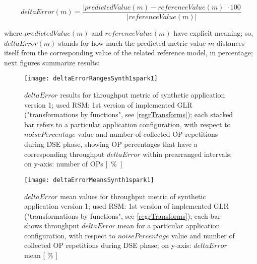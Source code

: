 \[
deltaError(m) = \dfrac{\left\vert predictedValue(m) - referenceValue(m) \right\vert \cdot 100}{\left\vert referenceValue(m) \right\vert}
\]

where $predictedValue(m)$ and $referenceValue(m)$ have explicit meaning; so, $deltaError(m)$ stands for how much the predicted metric value $m$ distances itself from the corresponding value of the related reference model, in percentage; next figures summarize results:





\begin{figure}[H]

    \centering
    
    \texttt{[image: deltaErrorRangesSynth1spark1]}
    
     \caption[$deltaError$ results for throughput metric of synthetic application version 1; used RSM: 1st version of implemented GLR ("transformations by functions")]{$deltaError$ results for throughput metric of synthetic application version 1; used RSM: 1st version of implemented GLR ("transformations by functions", see \ref{regrTransforms}); each stacked bar refers to a particular application configuration, with respect to $noisePercentage$ value and number of collected OP repetitions during DSE phase, showing OP percentages that have a corresponding throughput $deltaError$ within prearranged intervals; on y-axis: number of OPs \hbox{[ \% ]}}
    
    \label{fig::synth1spark1::intervals}
    
\end{figure}

\begin{figure}[H]

    \centering
    
    \texttt{[image: deltaErrorMeansSynth1spark1]}
    
    \caption[$deltaError$ mean values for throughput metric of synthetic application version 1; used RSM: 1st version of implemented GLR ("transformations by functions")]{$deltaError$ mean values for throughput metric of synthetic application version 1; used RSM: 1st version of implemented GLR ("transformations by functions", see \ref{regrTransforms}); each bar shows throughput $deltaError$ mean for a particular application configuration, with respect to $noisePercentage$ value and number of collected OP repetitions during DSE phase; on y-axis: $deltaError$ mean [ \% ]}
    
    \label{fig::synth1spark1::means}
    
\end{figure}





